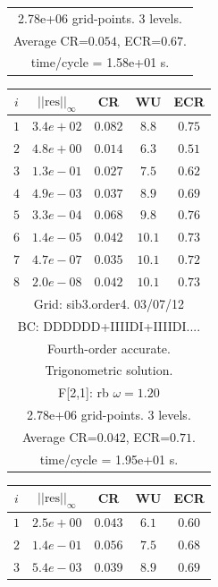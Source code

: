 \begin{table}[hbt]
\begin{center}
{\begin{tabular}{|c|c|c|c|c|}
\multicolumn{5}{|c|}{2.78e+06 grid-points. 3 levels.}  \\
\multicolumn{5}{|c|}{Average CR=$0.054$, ECR=$0.67$.}  \\
\multicolumn{5}{|c|}{time/cycle = 1.58e+01 s.}  \\
\hline 
\end{tabular}
\begin{tabular}{|c|c|c|c|c|} \hline 
 $i$   & $\vert\vert\mbox{res}\vert\vert_\infty$  &  CR     &  WU    & ECR  \\   \hline 
 $ 1$  & $ 3.4e+02$ & $0.082$ & $ 8.8$ & $0.75$ \\ 
 $ 2$  & $ 4.8e+00$ & $0.014$ & $ 6.3$ & $0.51$ \\ 
 $ 3$  & $ 1.3e-01$ & $0.027$ & $ 7.5$ & $0.62$ \\ 
 $ 4$  & $ 4.9e-03$ & $0.037$ & $ 8.9$ & $0.69$ \\ 
 $ 5$  & $ 3.3e-04$ & $0.068$ & $ 9.8$ & $0.76$ \\ 
 $ 6$  & $ 1.4e-05$ & $0.042$ & $10.1$ & $0.73$ \\ 
 $ 7$  & $ 4.7e-07$ & $0.035$ & $10.1$ & $0.72$ \\ 
 $ 8$  & $ 2.0e-08$ & $0.042$ & $10.1$ & $0.73$ \\ 
\hline 
\multicolumn{5}{|c|}{Grid: sib3.order4. 03/07/12}  \\
\multicolumn{5}{|c|}{BC: DDDDDD+IIIIDI+IIIIDI....}  \\
\multicolumn{5}{|c|}{Fourth-order accurate.}  \\
\multicolumn{5}{|c|}{Trigonometric solution.}  \\
\multicolumn{5}{|c|}{F[2,1]: rb $\omega=1.20$}  \\
\multicolumn{5}{|c|}{2.78e+06 grid-points. 3 levels.}  \\
\multicolumn{5}{|c|}{Average CR=$0.042$, ECR=$0.71$.}  \\
\multicolumn{5}{|c|}{time/cycle = 1.95e+01 s.}  \\
\hline 
\end{tabular}
\begin{tabular}{|c|c|c|c|c|} \hline 
 $i$   & $\vert\vert\mbox{res}\vert\vert_\infty$  &  CR     &  WU    & ECR  \\   \hline 
 $ 1$  & $ 2.5e+00$ & $0.043$ & $ 6.1$ & $0.60$ \\ 
 $ 2$  & $ 1.4e-01$ & $0.056$ & $ 7.5$ & $0.68$ \\ 
 $ 3$  & $ 5.4e-03$ & $0.039$ & $ 8.9$ & $0.69$ \\ 

\end{tabular}}
\end{center}
\end{table}
